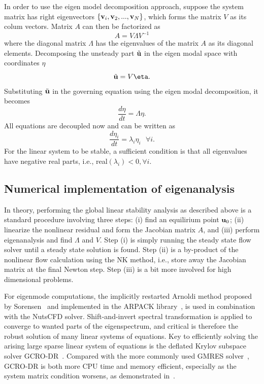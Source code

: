 \documentclass[journal,final]{new-aiaa}
\begin{document}
In order to use the eigen model decomposition approach, suppose
the system matrix has right eigenvectors $\{\mathbf{v}_i, \mathbf{v}_2, ..., \mathbf{v}_N\}$,
which forms the matrix $V$ as its colum vectors. Matrix $A$ can then
be factorized as 
\begin{equation*}
A=V\Lambda V^{-1}
\end{equation*}
where the diagonal matrix $\Lambda$ has the eigenvalues of the matrix $A$
as its diagonal elements.
Decomposing the unsteady part $\tilde {\mathbf{u}}$ in the eigen modal space with
coordinates $\eta$
\begin{equation*}
\tilde \uu = V {\mathbf \eta}.
\end{equation*}
Substituting $\tilde {\mathbf{u}}$ in the governing equation using the eigen modal
decomposition, it becomes
\begin{equation*}
\dfrac{d \eta}{dt}= \Lambda \eta.
\end{equation*}
All equations are decoupled now and can be written as
\begin{equation*}
\dfrac{d \eta_i}{dt}= \lambda_i \eta_i  ~~~\forall i.
\end{equation*}
For the linear system to be stable, a sufficient condition is
that all eigenvalues have negative real parts, i.e., real$(\lambda_i)<0, \forall i$.

\subsection{Numerical implementation of eigenanalysis}
In theory, performing the global linear stability analysis as described above
is a standard procedure involving three steps: (i) find an equilirium point $\mathbf{u}_0$;
(ii) linearize the nonlinear residual and form the Jacobian matrix $A$, and
(iii) perform eigenanalysis and find $\Lambda$ and $V$. Step (i) is simply
running the steady state flow solver until a steady state solution
is found. Step (ii) is a by-product of the nonlinear flow calculation using
the NK method, i.e., store away the Jacobian matrix at the final Newton step.
Step (iii) is a bit more involved for high dimensional problems.

For eigenmode computations, the implicitly restarted Arnoldi method proposed
by Sorensen~\cite{sorensen1992implicit} and implemented in the ARPACK
library~\cite{lehoucq1998arpack}, is used
in combination with the NutsCFD solver.
Shift-and-invert spectral transformation is applied to converge to wanted parts
of the eigenspectrum, and critical is therefore the robust solution of many linear
systems of equations. 
Key to efficiently solving the arising large sparse linear system of equations
is the deflated Krylov subspace solver GCRO-DR~\cite{parks2006recycling}.
Compared with the more commonly used GMRES solver~\cite{saad1986gmres},
GCRO-DR is both more CPU time and memory efficient, especially as the system
matrix condition worsens, as demonstrated in~\cite{xu2016enabling,xu2017robust}.
\end{document}
